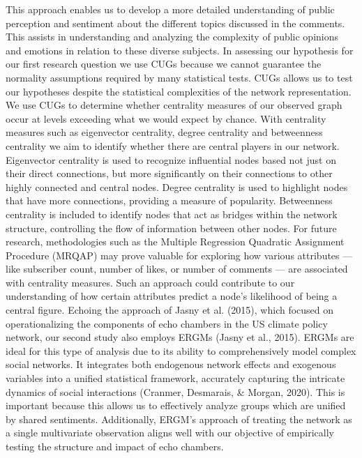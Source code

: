 \documentclass[
  man,floatsintext]{apa6}
\begin{document}
This approach enables us to develop a more detailed understanding of public perception and sentiment about the different topics discussed in the comments. This assists in understanding and analyzing the complexity of public opinions and emotions in relation to these diverse subjects.
In assessing our hypothesis for our first research question we use CUGs because we cannot guarantee the normality assumptions required by many statistical tests. CUGs allows us to test our hypotheses despite the statistical complexities of the network representation. We use CUGs to determine whether centrality measures of our observed graph occur at levels exceeding what we would expect by chance. With centrality measures such as eigenvector centrality, degree centrality and betweenness centrality we aim to identify whether there are central players in our network. Eigenvector centrality is used to recognize influential nodes based not just on their direct connections, but more significantly on their connections to other highly connected and central nodes. Degree centrality is used to highlight nodes that have more connections, providing a measure of popularity. Betweenness centrality is included to identify nodes that act as bridges within the network structure, controlling the flow of information between other nodes.
For future research, methodologies such as the Multiple Regression Quadratic Assignment Procedure (MRQAP) may prove valuable for exploring how various attributes --- like subscriber count, number of likes, or number of comments --- are associated with centrality measures. Such an approach could contribute to our understanding of how certain attributes predict a node's likelihood of being a central figure.
Echoing the approach of Jasny et al. (2015), which focused on operationalizing the components of echo chambers in the US climate policy network, our second study also employs ERGMs (Jasny et al., 2015). ERGMs are ideal for this type of analysis due to its ability to comprehensively model complex social networks. It integrates both endogenous network effects and exogenous variables into a unified statistical framework, accurately capturing the intricate dynamics of social interactions (Cranmer, Desmarais, \& Morgan, 2020). This is important because this allows us to effectively analyze groups which are unified by shared sentiments. Additionally, ERGM's approach of treating the network as a single multivariate observation aligns well with our objective of empirically testing the structure and impact of echo chambers. \newpage
\end{document}

